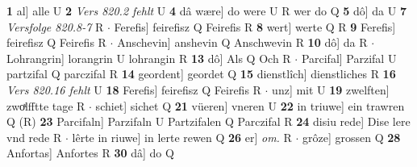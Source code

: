 \documentclass[8pt,a4paper,notitlepage]{article}
\begin{document}
\begin{table}[ht]
\begin{minipage}[t]{0.5\linewidth}
\textbf{1} al] alle U \textbf{2} \textit{Vers 820.2 fehlt} U  \textbf{4} dâ wære] do were U R wer do Q \textbf{5} dô] da U \textbf{7} \textit{Versfolge 820.8-7} R   $\cdot$ Ferefis] feirefisz Q Feirefis R \textbf{8} wert] werte Q R \textbf{9} Ferefis] feirefisz Q Feirefis R  $\cdot$ Anschevin] anshevin Q Anschwevin R \textbf{10} dô] da R  $\cdot$ Lohrangrin] lorangrin U lohrangin R \textbf{13} dô] Als Q Och R  $\cdot$ Parcifal] Parzifal U partzifal Q parczifal R \textbf{14} geordent] geordet Q \textbf{15} dienstlîch] dienstliches R \textbf{16} \textit{Vers 820.16 fehlt} U  \textbf{18} Ferefis] feirefisz Q Feirefis R  $\cdot$ unz] mit U \textbf{19} zwelften] zwoͯlfftte tage R  $\cdot$ schiet] sichet Q \textbf{21} vüeren] vneren U \textbf{22} in triuwe] ein trawren Q (R) \textbf{23} Parcifaln] Parzifaln U Partzifalen Q Parczifal R \textbf{24} disiu rede] Dise lere vnd rede R  $\cdot$ lêrte in riuwe] in lerte rewen Q \textbf{26} er] \textit{om.} R  $\cdot$ grôze] grossen Q \textbf{28} Anfortas] Anfortes R \textbf{30} dâ] do Q \newline
\end{minipage}
\end{table}
\end{document}
